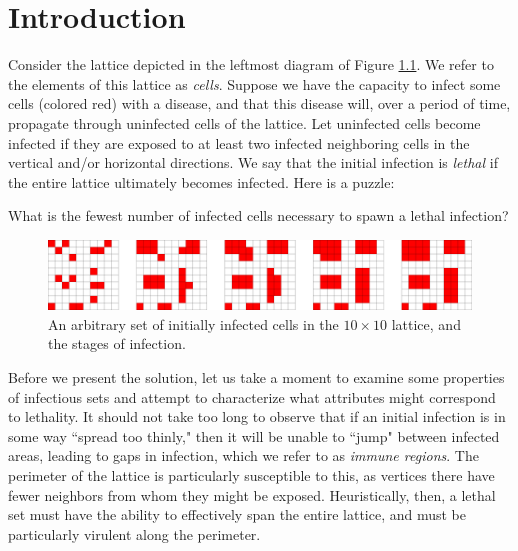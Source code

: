 \chapter{Introduction}

Consider the lattice depicted in the leftmost diagram of Figure \ref{fig:simple_puzzle}. We refer to the elements of this lattice as \emph{cells}. Suppose we have the capacity to infect some cells (colored red) with a disease, and that this disease will, over a period of time, propagate through uninfected cells of the lattice. Let uninfected cells become infected if they are exposed to at least two infected neighboring cells in the vertical and/or horizontal directions. We say that the initial infection is \emph{lethal} if the entire lattice ultimately becomes infected. Here is a puzzle:

\begin{question}
\label{que:simple_puzzle}
What is the fewest number of infected cells necessary to spawn a lethal infection?
\end{question}

\begin{figure}[]
\centering
\includegraphics[width=\textwidth]{figures/1/simple_puzzle.pdf}
\caption{An arbitrary set of initially infected cells in the $10 \times 10$ lattice, and the stages of infection.}
\label{fig:simple_puzzle}
\end{figure} 

Before we present the solution,
let us take a moment to examine some properties of infectious sets and attempt to characterize what attributes might correspond to lethality. It should not take too long to observe that if an initial infection is in some way ``spread too thinly," then it will be unable to ``jump" between infected areas, leading to gaps in infection, which we refer to as \emph{immune regions}. The perimeter of the lattice is particularly susceptible to this, as vertices there have fewer neighbors from whom they might be exposed. Heuristically, then, a lethal set must have the ability to effectively span the entire lattice, and must be particularly virulent along the perimeter. 

